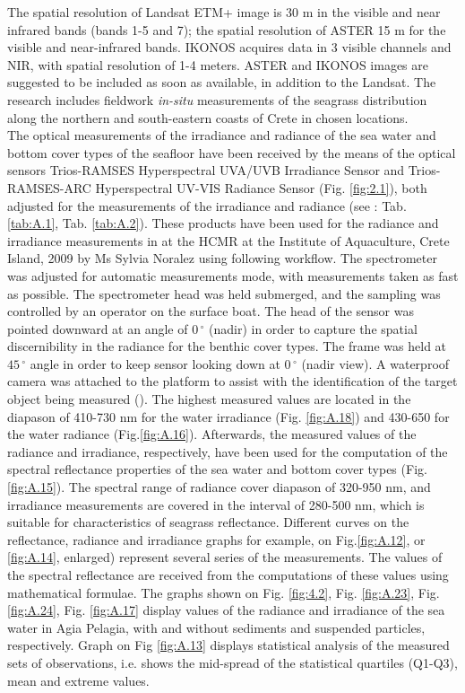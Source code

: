 \documentclass[11pt]{article}
\begin{document}
The spatial resolution of \ac{Landsat ETM+} image is 30 m in the visible and near infrared bands (bands
1-5 and 7); the spatial resolution of \ac{ASTER} 15 m for the visible and near-infrared bands. IKONOS
acquires data in 3 visible channels and \ac{NIR}, with spatial resolution of 1-4 meters. \ac{ASTER} and
IKONOS images are suggested to be included as soon as available, in addition to the Landsat. The
research includes fieldwork \textit{in-situ} measurements of the seagrass distribution along the northern and
south-eastern coasts of Crete in chosen locations.\\
The optical measurements of the irradiance and radiance of the sea water and bottom cover types of
the seafloor have been received by the means of the optical sensors \ac{Trios-RAMSES} Hyperspectral
\ac{UVA}/\ac{UVB} Irradiance Sensor and \ac{Trios-RAMSES}-ARC Hyperspectral \ac{UV}-\ac{VIS} Radiance Sensor (Fig. \ref{fig:2.1}), both adjusted for the measurements of the irradiance and radiance (see : Tab. \ref{tab:A.1}, Tab. \ref{tab:A.2}). 
These products have been used for the radiance and irradiance measurements in at the \ac{HCMR} at the Institute of Aquaculture, Crete Island, 2009 by Ms Sylvia Noralez using following workflow. The spectrometer was adjusted for automatic measurements mode, with measurements taken as fast as possible. The spectrometer head was held submerged, and the sampling was controlled by an operator on the surface boat. The head of the sensor was pointed downward at an angle of $0\,^{\circ}$ (nadir) in order to capture the spatial discernibility in the radiance for the benthic cover types. The frame was held at $45\,^{\circ}$ angle in order to keep sensor looking down at $0\,^{\circ}$ (nadir view). A waterproof camera was attached to the platform to assist with the identification of the target object  being measured (\cite{Noralez10}\label{Noralez10}).
The highest measured values are located in the diapason of 410-730 nm for the water irradiance (Fig. \ref{fig:A.18}) and 430-650 for the water radiance (Fig.\ref{fig:A.16}). 
Afterwards, the measured values of the radiance and irradiance, respectively, have been used for the computation of the spectral reflectance
properties of the sea water and bottom cover types (Fig.\ref{fig:A.15}). The spectral range of radiance
cover diapason of 320-950 nm, and irradiance measurements are covered in the interval of 280-500
nm, which is suitable for characteristics of seagrass reflectance.
Different curves on the reflectance, radiance and irradiance graphs for example, on Fig.\ref{fig:A.12}, or \ref{fig:A.14}, enlarged) represent several series of the measurements. The values of the spectral reflectance are received from the
computations of these values using mathematical formulae. The graphs shown on Fig. \ref{fig:4.2}, Fig. \ref{fig:A.23}, Fig. \ref{fig:A.24}, Fig. \ref{fig:A.17} display values of the radiance and irradiance of the sea water in Agia Pelagia, with and without sediments and suspended particles, respectively. Graph on Fig \ref{fig:A.13} displays statistical analysis of the measured sets of observations, i.e. shows the mid-spread of the statistical quartiles (Q1-Q3), mean and extreme values.
\end{document}
